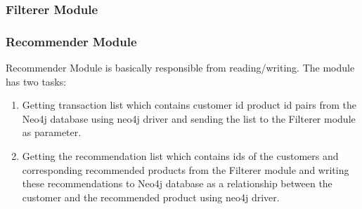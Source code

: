 	\subsubsection{Filterer Module} 

	\subsubsection{Recommender Module} Recommender Module is basically responsible from reading/writing. The module has two tasks:
	\begin{enumerate}
		\item Getting transaction list which contains customer id product id pairs from the Neo4j database using neo4j driver and sending the list to the Filterer module as parameter.
		\item Getting the recommendation list which contains ids of the customers and corresponding recommended products from the Filterer module and writing these recommendations to Neo4j database as a relationship between the customer and the recommended product using neo4j driver.
	\end{enumerate}